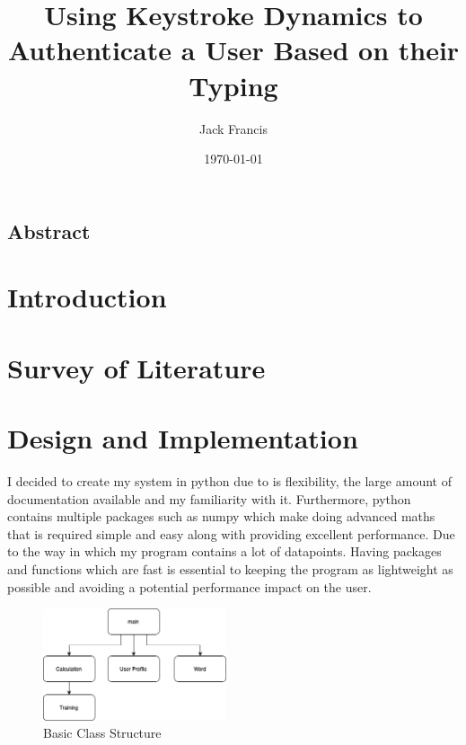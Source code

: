 \documentclass[10pt,a4paper]{report}
\title{Using Keystroke Dynamics to Authenticate a User Based on their Typing}
\author{Jack Francis}
\date{\today}
\begin{document}
\maketitle


\section{Abstract}

\tableofcontents

\chapter{Introduction}
\setcounter{page}{1}



\chapter{Survey of Literature}

\chapter{Design and Implementation}

I decided to create my system in python due to is flexibility, the large amount of documentation available and my familiarity with it. Furthermore, python contains multiple packages such as numpy which make doing advanced maths that is required simple and easy along with providing excellent performance. Due to the way in which my program contains a lot of datapoints. Having packages and functions which are fast is essential to keeping the program as lightweight as possible and avoiding a potential performance impact on the user.

\begin{figure}
	\begin{center}
		\includegraphics[width=0.48\textwidth]{OOP}
	\end{center}
	\caption{Basic Class Structure}
	\label{fig:ClassStruct}
\end{figure}
\end{document}
